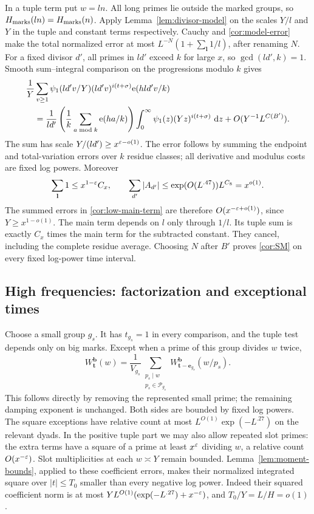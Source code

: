 In a tuple term put $w=ln$.  All long primes lie outside the marked
groups, so $H_{\rm marks}(ln)=H_{\rm marks}(n)$.  Apply
Lemma~\ref{lem:divisor-model} on the scales $Y/l$ and $Y$ in the
tuple and constant terms respectively.  Cauchy and
\eqref{cor:model-error} make the total normalized error at most
$L^{-N}(1+\sum_{\mathbf l}1/l)$, after renaming $N$.
For a fixed divisor $d'$, all primes in $ld'$ exceed $k$ for large
$x$, so $\gcd(ld',k)=1$.  Smooth sum--integral comparison on the
progressions modulo $k$ gives
\begin{align}
 &\frac1Y\sum_{v\geq1}
   \psi_1(ld'v/Y)(ld'v)^{i(t+\sigma)}\mathrm{e}(hld'v/k)
 \notag\\
 &\quad=\frac1{ld'}
       \left(\frac1k\sum_{a\bmod k}\mathrm{e}(ha/k)\right)
       \int_0^\infty\psi_1(z)(Yz)^{i(t+\sigma)}\,\,\mathrm d z
       +O(Y^{-1}L^{C(B')}).
 \label{cor:low-main-term}
\end{align}
The sum has scale $Y/(ld')\geq x^{\varepsilon-o(1)}$.  The error follows
by summing the endpoint and total-variation errors over $k$ residue
classes; all derivative and modulus costs are fixed log powers.
Moreover
\[
 \sum_{\mathbf l}1\leq x^{1-\varepsilon}C_x,\qquad
 \sum_{d'}|A_{d'}|
 \leq\exp(O(L^{.47}))L^{C_8}=x^{o(1)}.
\]
The summed errors in \eqref{cor:low-main-term} are therefore
$O(x^{-\varepsilon+o(1)})$, since $Y\geq x^{1-o(1)}$.
The main term depends on $l$ only through $1/l$.  Its tuple sum is
exactly $C_x$ times the main term for the subtracted constant.  They
cancel, including the complete residue average.  Choosing $N$ after
$B'$ proves \eqref{cor:SM} on every fixed log-power time interval.

\subsection{High frequencies: factorization and exceptional times}

Choose a small group $g_s$.  It has $t_{g_s}=1$ in every comparison,
and the tuple test depends only on big marks.  Except when a prime of
this group divides $w$ twice,
\begin{equation}\label{cor:extract-small}
 W_{\mathbf t}^{\mathbf b}(w)
  =\frac1{V_{g_s}}\sum_{\substack{p_s\mid w\\p_s\in\mathcal P_{g_s}}}
       W_{\mathbf t-\mathbf e_{g_s}}^{\mathbf b}(w/p_s).
\end{equation}
This follows directly by removing the represented small prime; the
remaining damping exponent is unchanged.  Both sides are bounded by
fixed log powers.  The square exceptions have relative count at most
$L^{O(1)}\exp(-L^{.27})$ on the relevant dyads.  In the positive
tuple part we may also allow repeated slot primes: the extra terms
have a square of a prime at least $x^\varepsilon$ dividing $w$, a relative
count $O(x^{-\varepsilon})$.  Slot multiplicities at each $w\asymp Y$ remain
bounded.  Lemma~\ref{lem:moment-bounds}, applied to these coefficient
errors, makes their normalized integrated square over $|t|\leq T_0$
smaller than every negative log power.  Indeed their squared coefficient
norm is at most
$YL^{O(1)}(\exp(-L^{.27})+x^{-\varepsilon})$, and
$T_0/Y=L/H=o(1)$.

